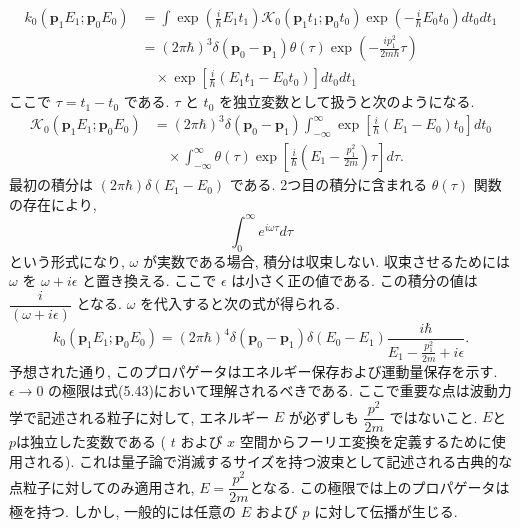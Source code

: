 \documentclass[a4paper,12pt]{article}
\begin{document}
\begin{align*}
    k_0(\mathbf{p}_1 E_1; \mathbf{p}_0 E_0) &= \int \exp \left( \frac{i}{\hbar} E_1 t_1 \right) \mathcal{K}_0(\mathbf{p}_1 t_1; \mathbf{p}_0 t_0) \exp \left( - \frac{i}{\hbar} E_0 t_0 \right) dt_0 dt_1 \\
    &= (2\pi \hbar)^3 \delta(\mathbf{p}_0 - \mathbf{p}_1) \theta(\tau) \exp \left( - \frac{ip_1^2}{2m\hbar} \tau \right) \\
    &\quad \times \exp \left[ \frac{i}{\hbar} (E_1 t_1 - E_0 t_0) \right] dt_0 dt_1 \tag{5.42}
\end{align*}
ここで $\tau = t_1 - t_0$ である. $\tau$ と $t_0$ を独立変数として扱うと次のようになる.
\begin{align*}
    \mathcal{K}_0(\mathbf{p}_1 E_1; \mathbf{p}_0 E_0) &= (2\pi \hbar)^3 \delta(\mathbf{p}_0 - \mathbf{p}_1) \int_{-\infty}^{\infty} \exp \left[ \frac{i}{\hbar} (E_1 - E_0) t_0 \right] dt_0 \\
    &\quad \times \int_{-\infty}^{\infty} \theta(\tau) \exp \left[ \frac{i}{\hbar} \left( E_1 - \frac{p_1^2}{2m} \right) \tau \right] d\tau.
\end{align*}
最初の積分は $(2\pi \hbar) \delta(E_1 - E_0)$ である. 2つ目の積分に含まれる $\theta(\tau)$ 関数の存在により,
\begin{equation*}
    \int_0^{\infty} e^{i\omega\tau} d\tau
\end{equation*}
という形式になり, $\omega$ が実数である場合, 積分は収束しない. 収束させるためには $\omega$ を $\omega + i\epsilon$ と置き換える. ここで $\epsilon$ は小さく正の値である. この積分の値は $\dfrac{i}{(\omega + i\epsilon)}$ となる. $\omega$ を代入すると次の式が得られる.
\begin{equation*}
    k_0(\mathbf{p}_1 E_1; \mathbf{p}_0 E_0) = (2\pi \hbar)^4 \delta(\mathbf{p}_0 - \mathbf{p}_1) \delta(E_0 - E_1) \frac{i\hbar}{E_1 - \frac{p_1^2}{2m} + i\epsilon}. \tag{5.43}
\end{equation*}
予想された通り, このプロパゲータはエネルギー保存および運動量保存を示す. $\epsilon \to 0$ の極限は式(5.43)において理解されるべきである. ここで重要な点は波動力学で記述される粒子に対して, エネルギー $E$ が必ずしも $\dfrac{p^2}{2m}$ ではないこと. $E$と$p$は独立した変数である ( $t$ および $x$ 空間からフーリエ変換を定義するために使用される). これは量子論で消滅するサイズを持つ波束として記述される古典的な点粒子に対してのみ適用され, $E = \dfrac{p^2}{2m}$となる. この極限では上のプロパゲータは極を持つ. しかし, 一般的には任意の $E$ および $p$ に対して伝播が生じる.\par
\end{document}
